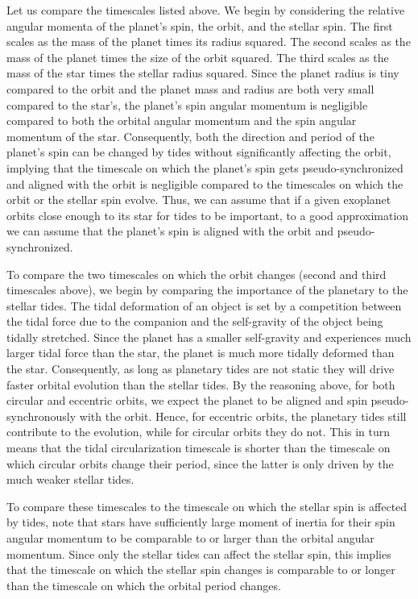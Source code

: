 Let us compare the timescales listed above. We begin by considering the relative
angular momenta of the planet's spin, the orbit, and the stellar spin. The first
scales as the mass of the planet times its radius squared. The second scales as
the mass of the planet times the size of the orbit squared. The third scales as
the mass of the star times the stellar radius squared. Since the planet radius
is tiny compared to the orbit and the planet mass and radius are both very small
compared to the star's, the planet's spin angular momentum is negligible
compared to both the orbital angular momentum and the spin angular momentum of
the star. Consequently, both the direction and period of the planet's spin can
be changed by tides without significantly affecting the orbit, implying that the
timescale on which the planet's spin gets pseudo-synchronized and aligned with
the orbit is negligible compared to the timescales on which the orbit or the
stellar spin evolve. Thus, we can assume that if a given exoplanet orbits close
enough to its star for tides to be important, to a good approximation we can
assume that the planet's spin is aligned with the orbit and pseudo-synchronized.

To compare the two timescales on which the orbit changes (second and third
timescales above), we begin by comparing the importance of the planetary to the
stellar tides. The tidal deformation of an object is set by a competition
between the tidal force due to the companion and the self-gravity of the object
being tidally stretched. Since the planet has a smaller self-gravity and
experiences much larger tidal force than the star, the planet is much more
tidally deformed than the star. Consequently, as long as planetary tides are not
static they will drive faster orbital evolution than the stellar tides. By the
reasoning above, for both circular and eccentric orbits, we expect the planet to
be aligned and spin pseudo-synchronously with the orbit.  Hence, for eccentric
orbits, the planetary tides still contribute to the evolution, while for
circular orbits they do not. This in turn means that the tidal circularization
timescale is shorter than the timescale on which circular orbits change their
period, since the latter is only driven by the much weaker stellar tides.

To compare these timescales to the timescale on which the stellar spin is
affected by tides, note that stars have sufficiently large moment of inertia
for their spin angular momentum to be comparable to or larger than the orbital
angular momentum. Since only the stellar tides can affect the stellar spin, this
implies that the timescale on which the stellar spin changes is comparable to or
longer than the timescale on which the orbital period changes.

